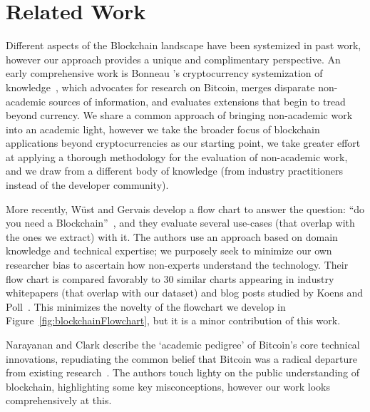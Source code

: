 
\section{Related Work}
\label{sec:related-works}

Different aspects of the Blockchain landscape have been systemized in past work, however our approach provides a unique and complimentary perspective. An early comprehensive work is Bonneau \etal's cryptocurrency systemization of knowledge~\cite{BMC+15}, which advocates for research on Bitcoin, merges disparate non-academic sources of information, and evaluates extensions that begin to tread beyond currency. We share a common approach of bringing non-academic work into an academic light, however we take the broader focus of blockchain applications beyond cryptocurrencies as our starting point, we take greater effort at applying a thorough methodology for the evaluation of non-academic work, and we draw from a different body of knowledge (\ie from industry practitioners instead of the developer community).

More recently, W{\"u}st and Gervais develop a flow chart to answer the question: ``do you need a Blockchain''~\cite{Wust17}, and they evaluate several use-cases (that overlap with the ones we extract) with it. The authors use an approach based on domain knowledge and technical expertise; we purposely seek to minimize our own researcher bias to ascertain how non-experts understand the technology. Their flow chart is compared favorably to 30 similar charts appearing in industry whitepapers (that overlap with our dataset) and blog posts studied by Koens and Poll~\cite{}. This minimizes the novelty of the flowchart we develop in Figure~\ref{fig:blockchainFlowchart}, but it is a minor contribution of this work. 

Narayanan and Clark describe the `academic pedigree' of Bitcoin's core technical innovations, repudiating the common belief that Bitcoin was a radical departure from existing research~\cite{Narayanan17}. The authors touch lighty on the public understanding of blockchain, highlighting some key misconceptions, however our work looks comprehensively at this. 


